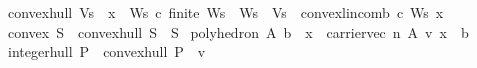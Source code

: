 \begin{isabellebody}
\isamarkupfalse%
\ {\isachardoublequoteopen}convex{\isacharunderscore}{\kern0pt}hull\ Vs\ {\isacharequal}{\kern0pt}\ {\isacharbraceleft}{\kern0pt}x{\isachardot}{\kern0pt}\ {\isasymexists}\ Ws\ c{\isachardot}{\kern0pt}\ finite\ Ws\ {\isasymand}\ Ws\ {\isasymsubseteq}\ Vs\ {\isasymand}\ convex{\isacharunderscore}{\kern0pt}lincomb\ c\ Ws\ x{\isacharbraceright}{\kern0pt}{\isachardoublequoteclose}\isanewline
{}\isamarkupfalse%
\ {\isachardoublequoteopen}convex\ S\ {\isacharequal}{\kern0pt}\ {\isacharparenleft}{\kern0pt}convex{\isacharunderscore}{\kern0pt}hull\ S\ {\isacharequal}{\kern0pt}\ S{\isacharparenright}{\kern0pt}{\isachardoublequoteclose}\isanewline
{}\isamarkupfalse%
\ {\isachardoublequoteopen}polyhedron\ A\ b\ {\isacharequal}{\kern0pt}\ {\isacharbraceleft}{\kern0pt}x\ {\isasymin}\ carrier{\isacharunderscore}{\kern0pt}vec\ n{\isachardot}{\kern0pt}\ A\ {\isacharasterisk}{\kern0pt}\isactrlsub v\ x\ {\isasymle}\ b{\isacharbraceright}{\kern0pt}{\isachardoublequoteclose}\isanewline
\isanewline
{}\isamarkupfalse%
\ {\isachardoublequoteopen}integer{\isacharunderscore}{\kern0pt}hull\ P\ {\isacharequal}{\kern0pt}\ convex{\isacharunderscore}{\kern0pt}hull\ {\isacharparenleft}{\kern0pt}P\ {\isasyminter}\ {\isasymint}\isactrlsub v{\isacharparenright}{\kern0pt}{\isachardoublequoteclose}\isanewline
{}\isamarkupfalse%
\isanewline
\isanewline
%
\isadelimtheory
\isanewline
%
\endisadelimtheory
%
\isatagtheory
{}\isamarkupfalse%
%
\endisatagtheory
{\isafoldtheory}%
%
\isadelimtheory
%
\endisadelimtheory
%
\end{isabellebody}%
\endinput

